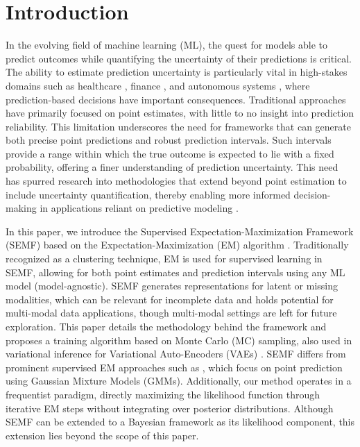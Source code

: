 \documentclass{article}
\begin{document}
\section{Introduction}
In the evolving field of machine learning (ML), the quest for models able to predict outcomes while quantifying the uncertainty of their predictions is critical. The ability to estimate prediction uncertainty is particularly vital in high-stakes domains such as healthcare \cite{dusenberry2020uncertainehr}, finance \cite{wisniewski2020confirmalfinance}, and autonomous systems \cite{tang2022prediction}, where prediction-based decisions have important consequences. Traditional approaches have primarily focused on point estimates, with little to no insight into prediction reliability. This limitation underscores the need for frameworks that can generate both precise point predictions and robust prediction intervals. Such intervals provide a range within which the true outcome is expected to lie with a fixed probability, offering a finer understanding of prediction uncertainty. This need has spurred research into methodologies that extend beyond point estimation to include uncertainty quantification, thereby enabling more informed decision-making in applications reliant on predictive modeling \cite{ghahramani2015probabilistic}.

In this paper, we introduce the Supervised Expectation-Maximization Framework (SEMF) based on the Expectation-Maximization (EM) algorithm \cite{Dempster1977}. Traditionally recognized as a clustering technique, EM is used for supervised learning in SEMF, allowing for both point estimates and prediction intervals using any ML model (model-agnostic). SEMF generates representations for latent or missing modalities, which can be relevant for incomplete data and holds potential for multi-modal data applications, though multi-modal settings are left for future exploration. This paper details the methodology behind the framework and proposes a training algorithm based on Monte Carlo (MC) sampling, also used in variational inference for Variational Auto-Encoders (VAEs) \cite{Blei2017, kingma2014vae}. SEMF differs from prominent supervised EM approaches such as \cite{ghahramani1993em}, which focus on point prediction using Gaussian Mixture Models (GMMs). Additionally, our method operates in a frequentist paradigm, directly maximizing the likelihood function through iterative EM steps without integrating over posterior distributions. Although SEMF can be extended to a Bayesian framework as its likelihood component, this extension lies beyond the scope of this paper.
\end{document}
